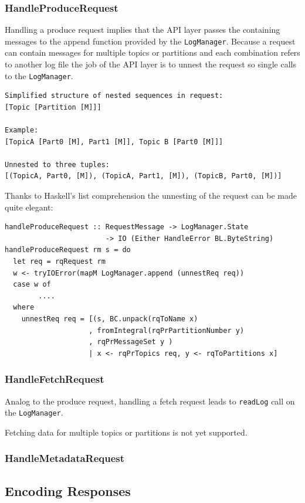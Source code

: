 \subsubsection{HandleProduceRequest}
\label{subsec:broker-api-producerequest}
Handling a produce request implies that the API layer passes the containing
messages to the append function provided by the \lstinline{LogManager}. Because
a request can contain messages for multiple topics or partitions and each combination
refers to another log file the job of the API layer is to unnest the request so
single calls to the \lstinline{LogManager}.
\begin{verbatim}
Simplified structure of nested sequences in request:
[Topic [Partition [M]]]

Example:
[TopicA [Part0 [M], Part1 [M]], Topic B [Part0 [M]]]

Unnested to three tuples:
[(TopicA, Part0, [M]), (TopicA, Part1, [M]), (TopicB, Part0, [M])]

\end{verbatim}

Thanks to Haskell's list comprehension the unnesting of the request can be made quite elegant: 
\begin{lstlisting}
handleProduceRequest :: RequestMessage -> LogManager.State 
                        -> IO (Either HandleError BL.ByteString)
handleProduceRequest rm s = do
  let req = rqRequest rm
  w <- tryIOError(mapM LogManager.append (unnestReq req))
  case w of
        .... 
  where
    unnestReq req = [(s, BC.unpack(rqToName x)
                    , fromIntegral(rqPrPartitionNumber y)
                    , rqPrMessageSet y ) 
                    | x <- rqPrTopics req, y <- rqToPartitions x]
\end{lstlisting}


\subsubsection{HandleFetchRequest}
\label{subsec:broker-api-fetchrequest}
Analog to the produce request, handling a fetch request leads to
\lstinline{readLog} call on the \lstinline{LogManager}.

Fetching data for multiple topics or partitions is not yet supported.
\subsubsection{HandleMetadataRequest}

\subsection{Encoding Responses}

